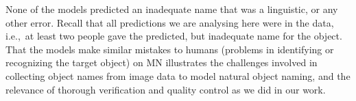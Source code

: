 %
None of the models predicted an inadequate name that was a linguistic, or any other error. 
Recall that all predictions we are analysing here were in the \mn data, i.e.,~at least two people gave the predicted, but inadequate name for the object. 
That the models make similar mistakes to humans (problems in identifying or recognizing the target object) on MN illustrates the challenges involved in collecting object names from image data to model natural object naming, and the relevance of thorough verification and quality control as we did in our work.  












